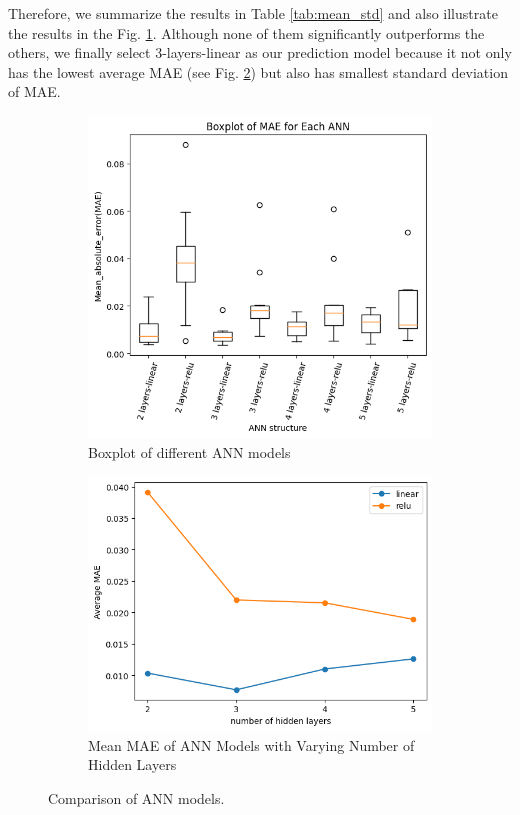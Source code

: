 \documentclass[manuscript,screen,review]{acmart}
\begin{document}
Therefore, we summarize the results in Table \ref{tab:mean_std} and also illustrate the results in the Fig. \ref{fig:boxplot}. Although none of them significantly outperforms the others, we finally select 3-layers-linear as our prediction model because it not only has the lowest average MAE (see Fig. \ref{fig:layers}) but also has smallest standard deviation of MAE.

\begin{figure}
    \begin{subfigure}{0.5\textwidth}
        \includegraphics[width=\linewidth]{boxplot.png}
        \caption{Boxplot of different ANN models}
        \label{fig:boxplot}
    \end{subfigure}
    \begin{subfigure}{0.5\textwidth}
        \includegraphics[width=\linewidth]{layers.png}
        \caption{Mean MAE of ANN Models with Varying Number of Hidden Layers}
        \label{fig:layers}
    \end{subfigure}
    \caption{Comparison of ANN models.}
    \label{fig:comparison}
\end{figure}
\end{document}
